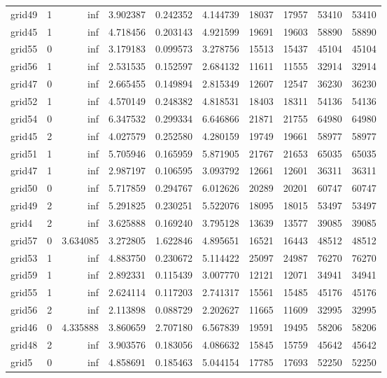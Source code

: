 \begin{longtable}{|l|r|r|r|r|r|r|r|r|r|}
grid49 & 1 & inf & 3.902387 & 0.242352 & 4.144739 & 18037 & 17957 & 53410 & 53410 \\
grid45 & 1 & inf & 4.718456 & 0.203143 & 4.921599 & 19691 & 19603 & 58890 & 58890 \\
grid55 & 0 & inf & 3.179183 & 0.099573 & 3.278756 & 15513 & 15437 & 45104 & 45104 \\
grid56 & 1 & inf & 2.531535 & 0.152597 & 2.684132 & 11611 & 11555 & 32914 & 32914 \\
grid47 & 0 & inf & 2.665455 & 0.149894 & 2.815349 & 12607 & 12547 & 36230 & 36230 \\
grid52 & 1 & inf & 4.570149 & 0.248382 & 4.818531 & 18403 & 18311 & 54136 & 54136 \\
grid54 & 0 & inf & 6.347532 & 0.299334 & 6.646866 & 21871 & 21755 & 64980 & 64980 \\
grid45 & 2 & inf & 4.027579 & 0.252580 & 4.280159 & 19749 & 19661 & 58977 & 58977 \\
grid51 & 1 & inf & 5.705946 & 0.165959 & 5.871905 & 21767 & 21653 & 65035 & 65035 \\
grid47 & 1 & inf & 2.987197 & 0.106595 & 3.093792 & 12661 & 12601 & 36311 & 36311 \\
grid50 & 0 & inf & 5.717859 & 0.294767 & 6.012626 & 20289 & 20201 & 60747 & 60747 \\
grid49 & 2 & inf & 5.291825 & 0.230251 & 5.522076 & 18095 & 18015 & 53497 & 53497 \\
grid4 & 2 & inf & 3.625888 & 0.169240 & 3.795128 & 13639 & 13577 & 39085 & 39085 \\
grid57 & 0 & 3.634085 & 3.272805 & 1.622846 & 4.895651 & 16521 & 16443 & 48512 & 48512 \\
grid53 & 1 & inf & 4.883750 & 0.230672 & 5.114422 & 25097 & 24987 & 76270 & 76270 \\
grid59 & 1 & inf & 2.892331 & 0.115439 & 3.007770 & 12121 & 12071 & 34941 & 34941 \\
grid55 & 1 & inf & 2.624114 & 0.117203 & 2.741317 & 15561 & 15485 & 45176 & 45176 \\
grid56 & 2 & inf & 2.113898 & 0.088729 & 2.202627 & 11665 & 11609 & 32995 & 32995 \\
grid46 & 0 & 4.335888 & 3.860659 & 2.707180 & 6.567839 & 19591 & 19495 & 58206 & 58206 \\
grid48 & 2 & inf & 3.903576 & 0.183056 & 4.086632 & 15845 & 15759 & 45642 & 45642 \\
grid5 & 0 & inf & 4.858691 & 0.185463 & 5.044154 & 17785 & 17693 & 52250 & 52250 \\

\end{longtable}
